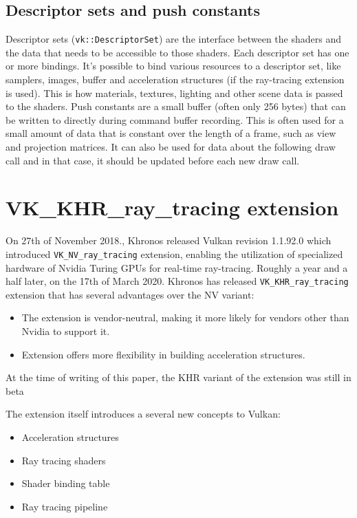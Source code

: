 \documentclass[times, utf8, zavrsni, numeric]{fer}
\begin{document}
\subsection{Descriptor sets and push constants}
Descriptor sets (\texttt{vk::DescriptorSet}) are the interface between the shaders and the data that needs to be accessible to those shaders. Each descriptor set has one or more bindings. It's possible to bind various resources to a descriptor set, like samplers, images, buffer and acceleration structures (if the ray-tracing extension is used). This is how materials, textures, lighting and other scene data is passed to the shaders.
Push constants are a small buffer (often only 256 bytes) that can be written to directly during command buffer recording. This is often used for a small amount of data that is constant over the length of a frame, such as view and projection matrices. It can also be used for data about the following draw call and in that case, it should be updated before each new draw call.

\section{VK\_KHR\_ray\_tracing extension}
On 27th of November 2018., Khronos released Vulkan revision 1.1.92.0 which introduced \texttt{VK\_NV\_ray\_tracing} extension, enabling the utilization of specialized hardware of Nvidia Turing GPUs for real-time ray-tracing. Roughly a year and a half later, on the 17th of March 2020. Khronos has released \texttt{VK\_KHR\_ray\_tracing} extension that has several advantages over the NV variant:
\begin{itemize}
\item{The extension is vendor-neutral, making it more likely for vendors other than Nvidia to support it.}
\item{Extension offers more flexibility in building acceleration structures.}
\end{itemize}

At the time of writing of this paper, the KHR variant of the extension was still in beta

The extension itself introduces a several new concepts to Vulkan:
\begin{itemize}
\item{Acceleration structures}
\item{Ray tracing shaders}
\item{Shader binding table}
\item{Ray tracing pipeline}
\end{itemize}
\end{document}
